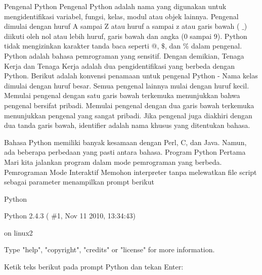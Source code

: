 {\fontsize{14pt}{14pt}\selectfont Pengenal Python Pengenal Python adalah nama yang digunakan untuk mengidentifikasi variabel, fungsi, kelas, modul atau objek lainnya. Pengenal dimulai dengan huruf A sampai Z atau huruf a sampai z atau garis bawah ( $  \_  $) diikuti oleh nol atau lebih huruf, garis bawah dan angka (0 sampai 9). Python tidak mengizinkan karakter tanda baca seperti @,  $  \$  $, dan $  \%  $ dalam pengenal. Python adalah bahasa pemrograman yang sensitif. Dengan demikian, Tenaga Kerja dan Tenaga Kerja adalah dua pengidentifikasi yang berbeda dengan Python. Berikut adalah konvensi penamaan untuk pengenal Python - Nama kelas dimulai dengan huruf besar. Semua pengenal lainnya mulai dengan huruf kecil. Memulai pengenal dengan satu garis bawah terkemuka menunjukkan bahwa pengenal bersifat pribadi. Memulai pengenal dengan dua garis bawah terkemuka menunjukkan pengenal yang sangat pribadi. Jika pengenal juga diakhiri dengan dua tanda garis bawah, identifier adalah nama khusus yang ditentukan bahasa. \\} \par
\vspace{14pt}
\noindent 
{\fontsize{14pt}{14pt}\selectfont \vspace{\baselineskip}
Bahasa Python memiliki banyak kesamaan dengan Perl, C, dan Java. Namun, ada beberapa perbedaan yang pasti antara bahasa. Program Python Pertama Mari kita jalankan program dalam mode pemrograman yang berbeda. Pemrograman Mode Interaktif Memohon interpreter tanpa melewatkan file script sebagai parameter menampilkan prompt berikut  \\} \par
\vspace{14pt}
\noindent 
{\fontsize{14pt}{14pt}\selectfont Python \\} \par
\vspace{14pt}
\noindent 
{\fontsize{14pt}{14pt}\selectfont Python 2.4.3 ( $  \#  $1, Nov 11 2010, 13:34:43) \\} \par
\noindent 
{\fontsize{14pt}{14pt} on linux2 \\} \par
\noindent 
{\fontsize{14pt}{14pt}\selectfont Type "help", "copyright", "credits" or "license" for more information. \\} \par
\vspace{14pt}
\noindent 
{\fontsize{14pt}{14pt}\selectfont Ketik teks berikut pada prompt Python dan tekan Enter: \\} \par
